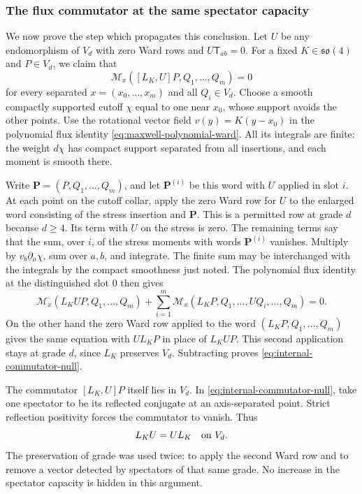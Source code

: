 \subsubsection{The flux commutator at the same spectator capacity}
We now prove the step which propagates this conclusion. Let $U$ be
any endomorphism of $V_d$ with zero Ward rows and
$U\mathsf T_{ab}=0$. For a fixed $K\in\mathfrak{so}(4)$ and
$P\in V_d$, we claim that
\begin{equation}\label{eq:internal-commutator-null}
 \mathcal M_x([L_K,U]P,Q_1,\ldots,Q_m)=0
\end{equation}
for every separated $x=(x_0,\ldots,x_m)$ and all $Q_i\in V_d$.
Choose a smooth compactly supported cutoff $\chi$ equal to one near
$x_0$, whose support avoids the other points. Use the rotational vector
field $v(y)=K(y-x_0)$ in the polynomial flux identity
\eqref{eq:maxwell-polynomial-ward}. All its integrals are finite:
the weight $d\chi$ has compact support separated from all insertions,
and each moment is smooth there.

Write $\mathbf P=(P,Q_1,\ldots,Q_m)$, and let $\mathbf P^{(i)}$
be this word with $U$ applied in slot $i$. At each point on the cutoff
collar, apply the zero Ward row for $U$ to the enlarged word consisting
of the stress insertion and $\mathbf P$. This is a permitted row at
grade $d$ because $d\geq4$. Its term with $U$ on the stress is zero.
The remaining terms say that the sum, over $i$, of the stress moments
with words $\mathbf P^{(i)}$ vanishes. Multiply by $v_b\partial_a\chi$,
sum over $a,b$, and integrate. The finite sum may be interchanged with
the integrals by the compact smoothness just noted. The polynomial
flux identity at the distinguished slot $0$ then gives
\[
 \mathcal M_x(L_KUP,Q_1,\ldots,Q_m)
 +\sum_{i=1}^m\mathcal M_x
       (L_KP,Q_1,\ldots,UQ_i,\ldots,Q_m)=0.
\]
On the other hand the zero Ward row applied to the word
$(L_KP,Q_1,\ldots,Q_m)$ gives the same equation with $UL_KP$ in
place of $L_KUP$. This second application stays at grade $d$, since
$L_K$ preserves $V_d$. Subtracting proves
\eqref{eq:internal-commutator-null}.

The commutator $[L_K,U]P$ itself lies in $V_d$. In
\eqref{eq:internal-commutator-null}, take one spectator to be its
reflected conjugate at an axis-separated point. Strict reflection
positivity forces the commutator to vanish. Thus
\begin{equation}\label{eq:internal-infinitesimal-commutation}
                         L_KU=UL_K\quad\hbox{on }V_d.
\end{equation}
The preservation of grade was used twice: to apply the second Ward
row and to remove a vector detected by spectators of that same grade.
No increase in the spectator capacity is hidden in this argument.

